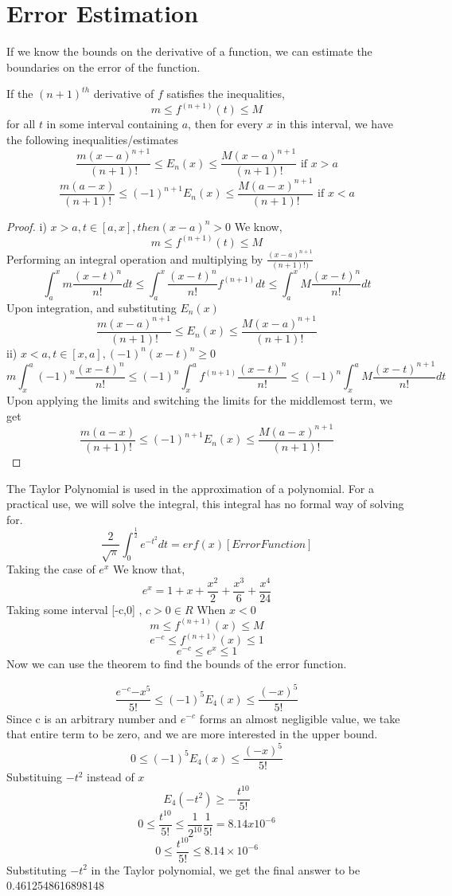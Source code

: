 \documentclass[twoside]{report}
\begin{document}
\section{Error Estimation} %
\label{sec:error_estimation}
If we know the bounds on the derivative of a function, we can estimate the boundaries on the error of the function. 
\begin{theorem}
   If the $(n+1)^{th}$ derivative of $f$ satisfies the inequalities, 
   \[
      m \leq f^{(n+1)}(t) \leq M
   \]
   for all $t$ in some interval containing $a$, then for every $x$ in this interval, we have the following inequalities/estimates
   \[
      \frac{m(x-a)^{n+1}}{(n+1)!} \leq E_n(x) \leq \frac{M(x-a)^{n+1}}{(n+1)!} \text{ if } x>a
   \]
   \[
      \frac{m(a-x)}{(n+1)!}  \leq (-1)^{n+1} E_n(x) \leq \frac{M(a-x)^{n+1}}{(n+1)!} \text{ if } x<a
   \]
\end{theorem}
\begin{proof}
   i) $x > a, t \in [a, x], then (x-a)^n > 0$
   We know,
   \[
      m \leq f^{(n+1)}(t) \leq M
   \]
   Performing an integral operation and multiplying by $\frac{(x-a)^{n+1}}{(n+1)!)}$
   \[
      \int_{a}^{x}m \frac{(x-t)^n}{n!}dt \leq \int_{a}^{x} \frac{(x-t)^{n}}{n!} f^{(n+1)} dt \leq \int_{a}^{x} M \frac{(x-t)^n}{n!} dt
   \]
   Upon integration, and substituting $E_n(x)$
   \[
      \frac{m(x-a)^{n+1}}{(n+1)!} \leq E_n(x) \leq \frac{M(x-a)^{n+1}}{(n+1)!} 
   \]
   ii) $x<a, t \in [x,a], (-1)^n (x-t)^n \geq 0 $
   \[
      m \int_{x}^{a} (-1)^n \frac{(x-t)^n}{n!} \leq (-1)^n \int_x^a f^{(n+1)}  \frac{(x-t)^n}{n!} \leq (-1)^n \int_x^a M \frac{(x-t)^{n+1}}{n!}dt
   \]
   Upon applying the limits and switching the limits for the middlemost term, we get 
   \[
      \frac{m(a-x)}{(n+1)!}  \leq (-1)^{n+1} E_n(x) \leq \frac{M(a-x)^{n+1}}{(n+1)!} 
   \]
\end{proof}
The Taylor Polynomial is used in the approximation of a polynomial. 
For a practical use, we will solve the integral, this integral has no formal way of solving for.
\[
   \frac{2}{\sqrt{\pi}} \int_0^{\frac{1}{2}} e^{-t^2} dt = erf(x) [Error Function]
\]
Taking the case of $e^x$
We know that,
\[
	e^x = 1 + x + \frac{x^2}{2} + \frac{x^3}{6} + \frac{x^4}{24}
\]
   Taking some interval [-c,0]	, $c > 0 \in R$
   When $x<0$
\[
	m \leq f^{(n+1)}(x) \leq M
\]
\[
   e^{-c} \leq f^{(n+1)}(x) \leq 1
\]
\[
   e^{-c} \leq e^x \leq 1
\]
Now we can use the theorem to find the bounds of the error function. 

\[
   \frac{e^{-c}{-x}^5}{5!} \leq (-1)^5 E_4(x) \leq \frac{(-x)^5}{5!}
\]
Since c is an arbitrary number and $e^{-c}$ forms an almost negligible value, we take that entire term to be zero, and we are more interested in the upper bound.
\[
   0 \leq (-1)^5 E_4(x) \leq \frac{(-x)^5}{5!}
\]
Substituing $-t^2$ instead of $x$ 
\[
E_4(-t^2) \geq -\frac{t^{10}}{5!}
\]
\[
   0 \leq \frac{t^10}{5!} \leq \frac{1}{2^{10}} \frac{1}{5!} = 8.14x10^{-6}
\]
\[
   0 \leq \frac{t^{10}}{5!} \leq 8.14\times10^{-6}
\]
Substituting $-t^2$ in the Taylor polynomial, we get the final answer to be 0.4612548616898148
\end{document}
